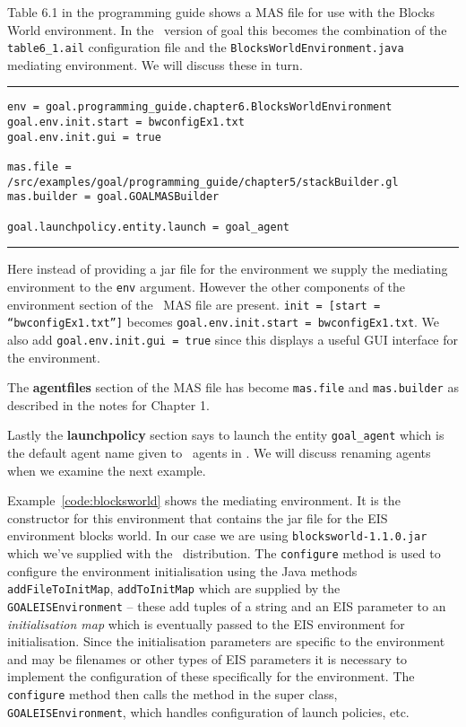 Table 6.1 in the programming guide shows a MAS file for use with the Blocks World environment.  In the \ail\ version of goal this becomes the combination of the \texttt{table6\_1.ail} configuration file and the \texttt{BlocksWorldEnvironment.java} mediating environment.  We will discuss these in turn.

\noindent\rule{\textwidth}{1pt}
\begin{small}
\begin{verbatim}
env = goal.programming_guide.chapter6.BlocksWorldEnvironment
goal.env.init.start = bwconfigEx1.txt
goal.env.init.gui = true

mas.file = /src/examples/goal/programming_guide/chapter5/stackBuilder.gl
mas.builder = goal.GOALMASBuilder

goal.launchpolicy.entity.launch = goal_agent
\end{verbatim}
\end{small}
\rule{\textwidth}{1pt}

Here instead of providing a jar file for the environment we supply the mediating environment to the \texttt{env} argument.  However the other components of the environment section of the \goal\ MAS file are present.  \texttt{init = [start = ``bwconfigEx1.txt'']} becomes \texttt{goal.env.init.start = bwconfigEx1.txt}.  We also add \texttt{goal.env.init.gui = true} since this displays a useful GUI interface for the environment.

The {\bf agentfiles} section of the MAS file has become \texttt{mas.file} and \texttt{mas.builder} as described in the notes for Chapter 1.

Lastly the {\bf launchpolicy} section says to launch the entity \texttt{goal\_agent} which is the default agent name given to \goal\ agents in \ail.  We will discuss renaming agents when we examine the next example.

Example~\ref{code:blocksworld} shows the mediating environment.  It is the constructor for this environment that contains the jar file for the EIS environment blocks world.  In our case we are using \texttt{blocksworld-1.1.0.jar} which we've supplied with the \mcapl\ distribution.  The \texttt{configure} method is used to configure the environment initialisation using the Java methods \texttt{addFileToInitMap}, \texttt{addToInitMap} which are supplied by the \texttt{GOALEISEnvironment} -- these add tuples of a string and an EIS parameter to an \emph{initialisation map} which is eventually passed to the EIS environment for initialisation.  Since the initialisation parameters are specific to the environment and may be filenames or other types of EIS parameters it is necessary to implement the configuration of these specifically for the environment.  The \texttt{configure} method then calls the method in the super class, \texttt{GOALEISEnvironment}, which handles configuration of launch policies, etc.

